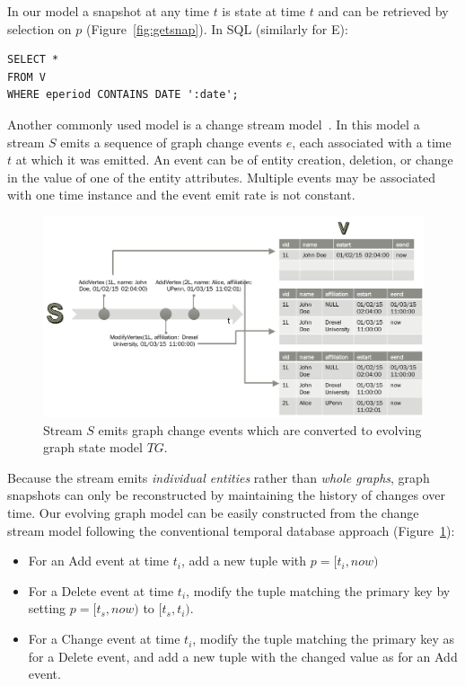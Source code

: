 In our model a snapshot at any time $t$ is state at time $t$ and can
be retrieved by selection on $p$ (Figure~\ref{fig:getsnap}). In SQL
(similarly for E):

\begin{small}
\begin{verbatim}
SELECT *
FROM V
WHERE eperiod CONTAINS DATE ':date';
\end{verbatim}
\end{small}

Another commonly used model is a change stream model~\cite{?}.  In
this model a stream $S$ emits a sequence of graph change events $e$,
each associated with a time $t$ at which it was emitted.  An event can
be of entity creation, deletion, or change in the value of one of the
entity attributes.  Multiple events may be associated with one time
instance and the event emit rate is not constant.

\begin{figure}
\includegraphics[width=6in]{figs/stream_to_state.pdf}
\caption{Stream $S$ emits graph change events which are converted to
  evolving graph state model $TG$.}
\label{fig:streamtotg}
\end{figure}

Because the stream emits {\em individual entities} rather than {\em
  whole graphs}, graph snapshots can only be reconstructed by
maintaining the history of changes over time.  Our evolving graph
model can be easily constructed from the change stream model following
the conventional temporal database approach
(Figure~\ref{fig:streamtotg}):
\begin{itemize}[noitemsep,topsep=0pt]
\item For an Add event at time $t_i$, add a new tuple with $p=[t_i,
  now)$
\item For a Delete event at time $t_i$, modify the tuple matching the
  primary key by setting $p=[t_s, now)$ to $[t_s, t_i)$.
\item For a Change event at time $t_i$, modify the tuple matching the
  primary key as for a Delete event, and add a new tuple with the
  changed value as for an Add event.
\end{itemize}

